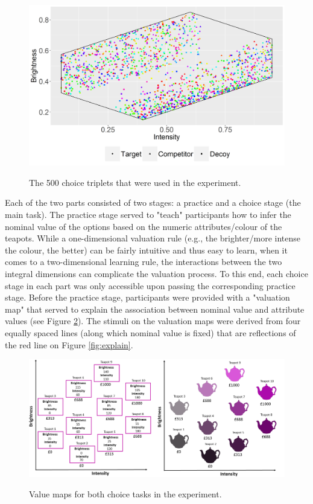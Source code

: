 \documentclass[11pt,a4paper]{article}
\begin{document}
\begin{figure}
\centering
\caption{The 500 choice triplets that were used in the experiment.}
\includegraphics[width=1\textwidth]{Figure_2poly.png}
\label{fig:choice_sets}
\end{figure}

Each of the two parts consisted of two stages: a practice and a choice stage (the main task). The practice stage served to "teach" participants how to infer the nominal value of the options based on the numeric attributes/colour of the teapots. While a one-dimensional valuation rule (e.g., the brighter/more intense the colour, the better) can be fairly intuitive and thus easy to learn, when it comes to a two-dimensional learning rule, the interactions between the two integral dimensions can complicate the valuation process. To this end, each choice stage in each part was only accessible upon passing the corresponding practice stage. Before the practice stage, participants  were provided with a "valuation map" that served to explain the association between nominal value and attribute values (see Figure \ref{fig:valuemaps}). The stimuli on the valuation maps were derived from four equally spaced lines (along which nominal value is fixed) that are reflections of the red line on Figure \ref{fig:explain}.


\begin{figure}
\centering
\caption{Value maps for both choice tasks in the experiment.}
\includegraphics[width=1\textwidth]{value_maps.png}
\label{fig:valuemaps}
\end{figure}
\end{document}
